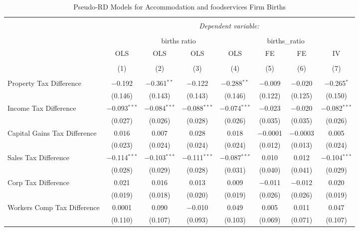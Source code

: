 
\begin{table}[!htbp] \centering 
  \caption{Pseudo-RD Models for  Accommodation and foodservices Firm Births} 
  \label{} 
\begin{tabular}{@{\extracolsep{5pt}}lccccccc} 
\\[-1.8ex]\hline 
\hline \\[-1.8ex] 
 & \multicolumn{7}{c}{\textit{Dependent variable:}} \\ 
\cline{2-8} 
\\[-1.8ex] & \multicolumn{4}{c}{births ratio} & \multicolumn{2}{c}{births\_ratio} &   \\ 
 & OLS & OLS & OLS & OLS & FE & FE & IV \\ 
\\[-1.8ex] & (1) & (2) & (3) & (4) & (5) & (6) & (7)\\ 
\hline \\[-1.8ex] 
 Property Tax Difference & $-$0.192 & $-$0.361$^{**}$ & $-$0.122 & $-$0.288$^{**}$ & $-$0.009 & $-$0.020 & $-$0.265$^{*}$ \\ 
  & (0.146) & (0.143) & (0.143) & (0.146) & (0.122) & (0.125) & (0.150) \\ 
  Income Tax Difference & $-$0.093$^{***}$ & $-$0.084$^{***}$ & $-$0.088$^{***}$ & $-$0.074$^{***}$ & $-$0.023 & $-$0.020 & $-$0.082$^{***}$ \\ 
  & (0.027) & (0.026) & (0.028) & (0.026) & (0.035) & (0.035) & (0.026) \\ 
  Capital Gains Tax Difference & 0.016 & 0.007 & 0.028 & 0.018 & $-$0.0001 & $-$0.0003 & 0.005 \\ 
  & (0.023) & (0.024) & (0.024) & (0.024) & (0.012) & (0.013) & (0.024) \\ 
  Sales Tax Difference & $-$0.114$^{***}$ & $-$0.103$^{***}$ & $-$0.111$^{***}$ & $-$0.087$^{***}$ & 0.010 & 0.012 & $-$0.104$^{***}$ \\ 
  & (0.028) & (0.029) & (0.028) & (0.031) & (0.040) & (0.041) & (0.029) \\ 
  Corp Tax Difference & 0.021 & 0.016 & 0.013 & 0.009 & $-$0.011 & $-$0.012 & 0.020 \\ 
  & (0.019) & (0.018) & (0.020) & (0.019) & (0.026) & (0.026) & (0.019) \\ 
  Workers Comp Tax Difference & 0.0001 & 0.090 & $-$0.010 & 0.049 & 0.005 & 0.011 & 0.047 \\ 
  & (0.110) & (0.107) & (0.093) & (0.103) & (0.069) & (0.071) & (0.107) \\ 

\end{tabular}
\end{table}
